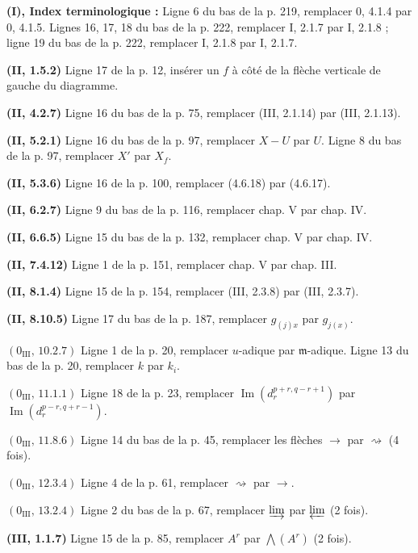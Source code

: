 \noindent\textbf{(I), Index terminologique :} Ligne 6 du bas de la p. 219,
remplacer 0, 4.1.4 par 0, 4.1.5. Lignes 16, 17, 18 du bas de la p. 222,
remplacer I, 2.1.7 par I, 2.1.8 ; ligne 19 du bas de la p. 222, remplacer I,
2.1.8 par I, 2.1.7.

\noindent\textbf{(II, 1.5.2)} Ligne 17 de la p. 12, insérer un $f$ à côté de
la flèche verticale de gauche du diagramme.

\noindent\textbf{(II, 4.2.7)} Ligne 16 du bas de la p. 75, remplacer (III,
2.1.14) par (III, 2.1.13).

\noindent\textbf{(II, 5.2.1)} Ligne 16 du bas de la p. 97, remplacer $X-U$ par
$U$. Ligne 8 du bas de la p. 97, remplacer $X'$ par $X_f$.

\noindent\textbf{(II, 5.3.6)} Ligne 16 de la p. 100, remplacer (4.6.18) par
(4.6.17).

\noindent\textbf{(II, 6.2.7)} Ligne 9 du bas de la p. 116, remplacer chap. V
par chap. IV.

\noindent\textbf{(II, 6.6.5)} Ligne 15 du bas de la p. 132, remplacer chap. V
par chap. IV.

\noindent\textbf{(II, 7.4.12)} Ligne 1 de la p. 151, remplacer chap. V par
chap. III.

\noindent\textbf{(II, 8.1.4)} Ligne 15 de la p. 154, remplacer (III, 2.3.8)
par (III, 2.3.7).

\noindent\textbf{(II, 8.10.5)} Ligne 17 du bas de la p. 187, remplacer
$g_{(j)x}$ par $g_{j(x)}$.

\noindent\textbf{$(0_{\mathrm{III}},\,10.2.7)$} Ligne 1 de la p. 20,
remplacer $u$-adique par $\mathfrak m$-adique. Ligne 13 du bas de la p. 20,
remplacer $k$ par $k_i$.

\noindent\textbf{$(0_{\mathrm{III}},\,11.1.1)$} Ligne 18 de la p. 23,
remplacer $\operatorname{Im}(d_r^{p+r,q-r+1})$ par
$\operatorname{Im}(d_r^{p-r,q+r-1})$.

\noindent\textbf{$(0_{\mathrm{III}},\,11.8.6)$} Ligne 14 du bas de la p. 45,
remplacer les flèches $\to$ par $\rightsquigarrow$ (4 fois).

\noindent\textbf{$(0_{\mathrm{III}},\,12.3.4)$} Ligne 4 de la p. 61,
remplacer $\rightsquigarrow$ par $\to$.

\noindent\textbf{$(0_{\mathrm{III}},\,13.2.4)$} Ligne 2 du bas de la p. 67,
remplacer $\varinjlim$ par $\varprojlim$ (2 fois).

\noindent\textbf{(III, 1.1.7)} Ligne 15 de la p. 85, remplacer $A^r$ par
$\bigwedge(A^r)$ (2 fois).

